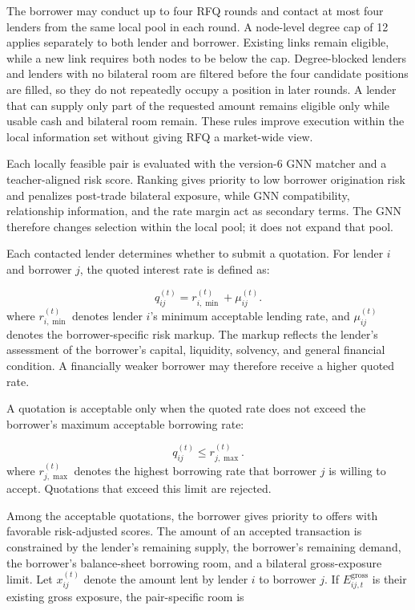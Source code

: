 The borrower may conduct up to four RFQ rounds and contact at most four
lenders from the same local pool in each round. A node-level degree cap of
12 applies separately to both lender and borrower. Existing links remain
eligible, while a new link requires both nodes to be below the cap.
Degree-blocked lenders and lenders with no bilateral room are filtered
before the four candidate positions are filled, so they do not repeatedly
occupy a position in later rounds. A lender that can supply only part of
the requested amount remains eligible only while usable cash and bilateral
room remain. These rules improve execution within the local information set
without giving RFQ a market-wide view.

Each locally feasible pair is evaluated with the version-6 GNN matcher and
a teacher-aligned risk score. Ranking gives priority to low borrower
origination risk and penalizes post-trade bilateral exposure, while GNN
compatibility, relationship information, and the rate margin act as
secondary terms. The GNN therefore changes selection within the local pool;
it does not expand that pool.

Each contacted lender determines whether to submit a quotation. For
lender \(i\) and borrower \(j\), the quoted interest rate is defined as:


\begin{equation}
q_{ij}^{(t)}=r_{i,\min}^{(t)}+\mu_{ij}^{(t)}\label{eq:rfq-quote}.
\end{equation}
\vspace{-0.4\baselineskip}
\noindent where \(r_{i,\min}^{(t)}\) denotes lender \(i\)'s minimum acceptable
lending rate, and \(\mu_{ij}^{(t)}\) denotes the borrower-specific risk
markup. The markup reflects the lender's assessment of the borrower's
capital, liquidity, solvency, and general financial condition. A
financially weaker borrower may therefore receive a higher quoted rate.

A quotation is acceptable only when the quoted rate does not exceed the
borrower's maximum acceptable borrowing rate:


\begin{equation}
q_{ij}^{(t)}\leq r_{j,\max}^{(t)}.
\end{equation}
\vspace{-0.4\baselineskip}
\noindent where \(r_{j,\max}^{(t)}\) denotes the highest borrowing rate that
borrower \(j\) is willing to accept. Quotations that exceed this limit
are rejected.

Among the acceptable quotations, the borrower gives priority to offers
with favorable risk-adjusted scores. The amount of an accepted
transaction is constrained by the lender's remaining supply, the
borrower's remaining demand, the borrower's balance-sheet borrowing room,
and a bilateral gross-exposure limit. Let \(x_{ij}^{(t)}\) denote the
amount lent by lender \(i\) to borrower \(j\). If
\(E_{ij,t}^{\mathrm{gross}}\) is their existing gross exposure, the
pair-specific room is

